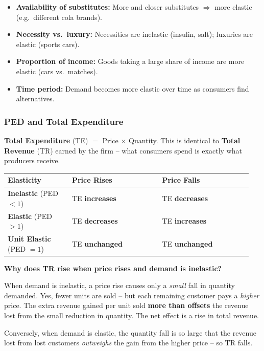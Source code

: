 \documentclass[11pt, a4paper, twoside]{book}
\begin{document}
\begin{itemize}
  \item \textbf{Availability of substitutes:} More and closer substitutes $\Rightarrow$ more elastic (e.g.\ different cola brands).
  \item \textbf{Necessity vs.\ luxury:} Necessities are inelastic (insulin, salt); luxuries are elastic (sports cars).
  \item \textbf{Proportion of income:} Goods taking a large share of income are more elastic (cars vs.\ matches).
  \item \textbf{Time period:} Demand becomes more elastic over time as consumers find alternatives.
\end{itemize}

\subsubsection{PED and Total Expenditure}

\textbf{Total Expenditure} (TE) $=$ Price $\times$ Quantity. This is identical to \textbf{Total Revenue} (TR) earned by the firm -- what consumers spend is exactly what producers receive.

\begin{tcolorbox}[enhanced,colback=LightBlue,colframe=MidBlue!70,arc=0pt,boxrule=0.8pt]
\begin{tabular}{@{}>{\RaggedRight\arraybackslash}p{0.25\linewidth}>{\RaggedRight\arraybackslash}p{0.35\linewidth}>{\RaggedRight\arraybackslash}p{0.35\linewidth}@{}}
\textbf{\color{NavyPrimary}Elasticity} & \textbf{\color{NavyPrimary}Price Rises} & \textbf{\color{NavyPrimary}Price Falls} \\
\midrule
\textbf{Inelastic} (PED $< 1$) & TE \textbf{increases} & TE \textbf{decreases} \\
\textbf{Elastic} (PED $> 1$) & TE \textbf{decreases} & TE \textbf{increases} \\
\textbf{Unit Elastic} (PED $= 1$) & TE \textbf{unchanged} & TE \textbf{unchanged} \\
\end{tabular}
\end{tcolorbox}

\begin{coreidea}
\textbf{Why does TR rise when price rises and demand is inelastic?}

When demand is inelastic, a price rise causes only a \emph{small} fall in quantity demanded. Yes, fewer units are sold -- but each remaining customer pays a \emph{higher} price. The extra revenue gained per unit sold \textbf{more than offsets} the revenue lost from the small reduction in quantity. The net effect is a rise in total revenue.

Conversely, when demand is elastic, the quantity fall is so large that the revenue lost from lost customers \emph{outweighs} the gain from the higher price -- so TR falls.
\end{coreidea}
\end{document}
